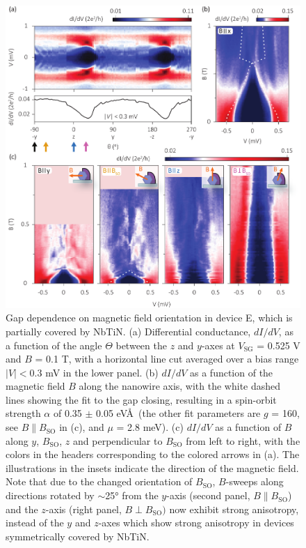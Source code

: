 \begin{figure}
\begin{center}
\centering
\includegraphics[width=\columnwidth]{chapter_spinorbit/figures/SFig6_Bsweeps_half.pdf}
\caption{\label{fig:BsweepsHalf}
Gap dependence on magnetic field orientation in device E, which is partially covered by NbTiN.
(a) Differential conductance, $dI/dV$, as a function of the angle $\Theta$ between the $z$ and $y$-axes at $V_{\mathrm{SG}}$ = 0.525 V and $B$ = 0.1 T, with a horizontal line cut averaged over a bias range $|V| < 0.3$ mV in the lower panel.
(b) $dI/dV$ as a function of the magnetic field $B$ along the nanowire axis, with the white dashed lines showing the fit to the gap closing, resulting in a spin-orbit strength $\alpha$ of 0.35 $\pm$ 0.05 eV\AA\ (the other fit parameters are $g$ = 160, see $B \parallel B_{\mathrm{SO}}$ in (c), and $\mu$ = 2.8 meV).
(c) $dI/dV$ as a function of $B$ along $y$, $B_{\mathrm{SO}}$, $z$ and perpendicular to $B_{\mathrm{SO}}$ from left to right, with the colors in the headers corresponding to the colored arrows in (a).
The illustrations in the insets indicate the direction of the magnetic field.
Note that due to the changed orientation of $B_{\mathrm{SO}}$, $B$-sweeps along directions rotated by $\sim$\ang{25} from the $y$-axis (second panel, $B \parallel B_{\mathrm{SO}}$) and the $z$-axis (right panel, $B \perp B_{\mathrm{SO}})$  now exhibit strong anisotropy, instead of the $y$ and $z$-axes which show strong anisotropy in devices symmetrically covered by NbTiN.
}
\end{center}
\end{figure}

